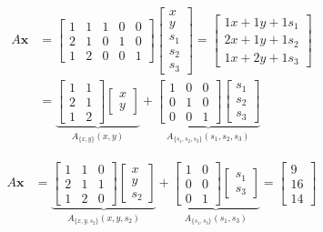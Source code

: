 \bigskip

\begin{align*}
A\mathbf{x}
&=
\begin{bmatrix}
1 & 1 & 1 & 0 & 0 \\
2 & 1 & 0 & 1 & 0 \\
1 & 2 & 0 & 0 & 1
\end{bmatrix}
\begin{bmatrix}
x \\ y \\ s_1 \\ s_2 \\ s_3
\end{bmatrix}
=
\begin{bmatrix}
1x + 1y + 1s_1 \\
2x + 1y + 1s_2 \\
1x + 2y + 1s_3
\end{bmatrix} \\
&=
\underbrace{
\begin{bmatrix}
1 & 1 \\
2 & 1 \\
1 & 2
\end{bmatrix}
\begin{bmatrix}
x \\ y
\end{bmatrix}
}_{A_{\{x,y\}} (x, y)}
+
\underbrace{
\begin{bmatrix}
1 & 0 & 0 \\
0 & 1 & 0 \\
0 & 0 & 1
\end{bmatrix}
\begin{bmatrix}
s_1 \\ s_2 \\ s_3
\end{bmatrix}
}_{A_{\{s_1,s_2,s_3\}} (s_1, s_2, s_3)}
\end{align*}

\bigskip

\begin{align*}
A\mathbf{x}
&=
\underbrace{
\begin{bmatrix}
1 & 1 & 0 \\
2 & 1 & 1 \\
1 & 2 & 0
\end{bmatrix}
\begin{bmatrix}
x \\ y \\ s_2
\end{bmatrix}
}_{A_{\{x, y, s_2\}} (x, y, s_2)}
+
\underbrace{
\begin{bmatrix}
1 & 0 \\
0 & 0 \\
0 & 1
\end{bmatrix}
\begin{bmatrix}
s_1 \\ s_3
\end{bmatrix}
}_{A_{\{s_1, s_3\}} (s_1, s_3)}
=
\begin{bmatrix}
9 \\ 16 \\ 14
\end{bmatrix}
\end{align*}

